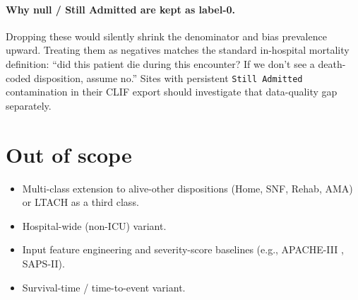 \documentclass[11pt]{article}
\begin{document}
\paragraph{Why null / Still Admitted are kept as label-0.}
Dropping these would silently shrink the denominator and bias
prevalence upward. Treating them as negatives matches the standard
in-hospital mortality definition: ``did this patient die during this
encounter? If we don't see a death-coded disposition, assume no.''
Sites with persistent \texttt{Still Admitted} contamination in their
CLIF export should investigate that data-quality gap separately.

\section{Out of scope}

\begin{itemize}[leftmargin=2em]
  \item Multi-class extension to alive-other dispositions (Home, SNF,
        Rehab, AMA) or LTACH as a third class.
  \item Hospital-wide (non-ICU) variant.
  \item Input feature engineering and severity-score baselines
        (e.g., APACHE-III \citep{knaus1991apache3}, SAPS-II).
  \item Survival-time / time-to-event variant.
\end{itemize}



\end{document}
